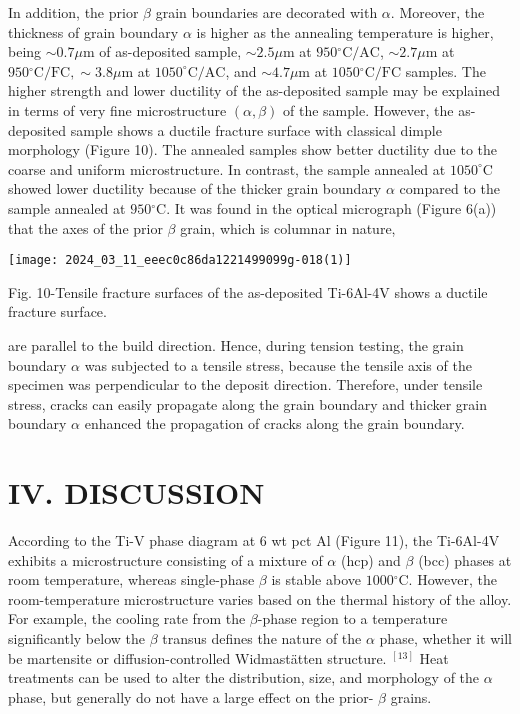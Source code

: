 \documentclass[10pt]{article}
\begin{document}
In addition, the prior $\beta$ grain boundaries are decorated with $\alpha$. Moreover, the thickness of grain boundary $\alpha$ is higher as the annealing temperature is higher, being $\sim 0.7 \mu \mathrm{m}$ of as-deposited sample, $\sim 2.5 \mu \mathrm{m}$ at $950{ }^{\circ} \mathrm{C} / \mathrm{AC}$, $\sim 2.7 \mu \mathrm{m}$ at $950{ }^{\circ} \mathrm{C} / \mathrm{FC}, \sim 3.8 \mu \mathrm{m}$ at $1050^{\circ} \mathrm{C} / \mathrm{AC}$, and $\sim 4.7 \mu \mathrm{m}$ at $1050{ }^{\circ} \mathrm{C} / \mathrm{FC}$ samples. The higher strength and lower ductility of the as-deposited sample may be explained in terms of very fine microstructure $(\alpha, \beta)$ of the sample. However, the as-deposited sample shows a ductile fracture surface with classical dimple morphology (Figure 10). The annealed samples show better ductility due to the coarse and uniform microstructure. In contrast, the sample annealed at $1050^{\circ} \mathrm{C}$ showed lower ductility because of the thicker grain boundary $\alpha$ compared to the sample annealed at $950{ }^{\circ} \mathrm{C}$. It was found in the optical micrograph (Figure 6(a)) that the axes of the prior $\beta$ grain, which is columnar in nature,

\begin{center}
\texttt{[image: 2024\_03\_11\_eeec0c86da1221499099g-018(1)]}
\end{center}

Fig. 10-Tensile fracture surfaces of the as-deposited Ti-6Al-4V shows a ductile fracture surface.

are parallel to the build direction. Hence, during tension testing, the grain boundary $\alpha$ was subjected to a tensile stress, because the tensile axis of the specimen was perpendicular to the deposit direction. Therefore, under tensile stress, cracks can easily propagate along the grain boundary and thicker grain boundary $\alpha$ enhanced the propagation of cracks along the grain boundary.

\section*{IV. DISCUSSION}
According to the Ti-V phase diagram at 6 wt pct $\mathrm{Al}$ (Figure 11), the Ti-6Al-4V exhibits a microstructure consisting of a mixture of $\alpha$ (hcp) and $\beta$ (bcc) phases at room temperature, whereas single-phase $\beta$ is stable above $1000{ }^{\circ} \mathrm{C}$. However, the room-temperature microstructure varies based on the thermal history of the alloy. For example, the cooling rate from the $\beta$-phase region to a temperature significantly below the $\beta$ transus defines the nature of the $\alpha$ phase, whether it will be martensite or diffusion-controlled Widmastätten structure. ${ }^{[13]}$ Heat treatments can be used to alter the distribution, size, and morphology of the $\alpha$ phase, but generally do not have a large effect on the prior- $\beta$ grains.
\end{document}
